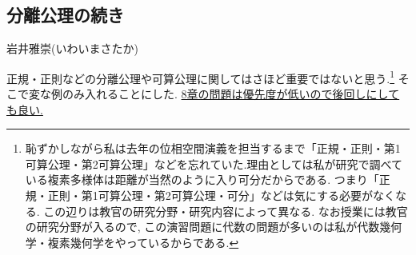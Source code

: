 \documentclass[dvipdfmx,a4paper,11pt]{article}
\newcommand{\R}{\mathbb{R}}
\theoremstyle{definition}
\begin{document}
\begin{enumerate}[label=\textbf{問}\ref*{sec-Hausdorff}.\arabic*]


	
 \end{enumerate}
 

\newpage


\begin{center}
\section{分離公理の続き}
\label{sec-countable}
\end{center}

\begin{flushright}
 岩井雅崇(いわいまさたか)
\end{flushright}

正規・正則などの分離公理や可算公理に関してはさほど重要ではないと思う.\footnote{恥ずかしながら私は去年の位相空間演義を担当するまで「正規・正則・第1可算公理・第2可算公理」などを忘れていた.理由としては私が研究で調べている複素多様体は距離が当然のように入り可分だからである. つまり「正規・正則・第1可算公理・第2可算公理・可分」などは気にする必要がなくなる. この辺りは教官の研究分野・研究内容によって異なる. なお授業には教官の研究分野が入るので, この演習問題に代数の問題が多いのは私が代数幾何学・複素幾何学をやっているからである.}
そこで変な例のみ入れることにした.
\underline{8章の問題は優先度が低いので後回しにしても良い.}
\end{document}

